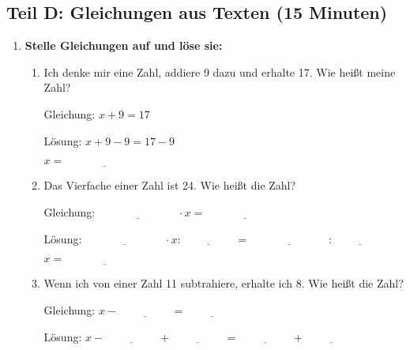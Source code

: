 \subsection*{Teil D: Gleichungen aus Texten (15 Minuten)}

\begin{enumerate}[label=\arabic*.]
    \item \textbf{Stelle Gleichungen auf und löse sie:}
    \vspace{0.5cm}

    \begin{enumerate}[label=\alph*)]
        \item Ich denke mir eine Zahl, addiere 9 dazu und erhalte 17. Wie heißt meine Zahl?

        Gleichung: $x + 9 = 17$

        Lösung: $x + 9 - 9 = 17 - 9$

        $x = \underline{\hspace{3cm}}$

        \vspace{0.5cm}

        \item Das Vierfache einer Zahl ist 24. Wie heißt die Zahl?

        Gleichung: $\underline{\hspace{3cm}} \cdot x = \underline{\hspace{3cm}}$

        Lösung: $\underline{\hspace{3cm}} \cdot x : \underline{\hspace{2cm}} = \underline{\hspace{3cm}} : \underline{\hspace{2cm}}$

        $x = \underline{\hspace{3cm}}$

        \vspace{0.5cm}

        \item Wenn ich von einer Zahl 11 subtrahiere, erhalte ich 8. Wie heißt die Zahl?

        Gleichung: $x - \underline{\hspace{2cm}} = \underline{\hspace{2cm}}$

        Lösung: $x - \underline{\hspace{2cm}} + \underline{\hspace{2cm}} = \underline{\hspace{2cm}} + \underline{\hspace{2cm}}$


\end{enumerate}
\end{enumerate}

